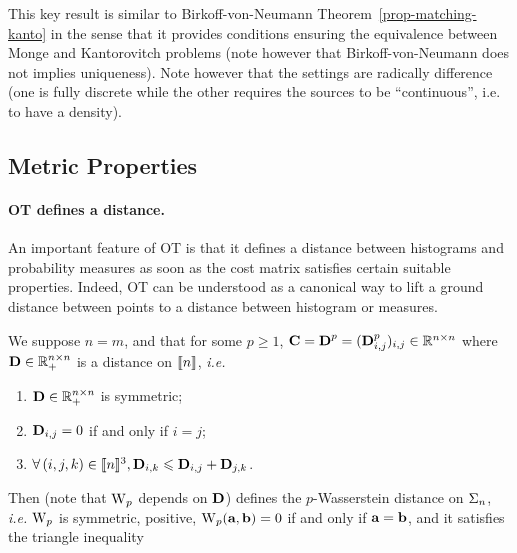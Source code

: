 This key result is similar to Birkoff-von-Neumann Theorem~\ref{prop-matching-kanto} in the sense that it provides conditions ensuring the equivalence between Monge and Kantorovitch problems (note however that Birkoff-von-Neumann does not implies uniqueness). Note however that the settings are radically difference (one is fully discrete while the other requires the sources to  be ``continuous'', i.e. to have a density).


\subsection{Metric Properties}

\paragraph{OT defines a distance.}

An important feature of OT is that it defines a distance between histograms and probability measures as soon as the cost matrix satisfies certain suitable properties. Indeed, OT can be understood as a canonical way to lift a ground distance between points to a distance between histogram or measures. 


\begin{prop}\label{prop-metric-histo}
We suppose $n=m$, and that for some $p \geq 1$, $\mathrm{\textbf{\upshape C}}=\mathrm{\textbf{\upshape D}}^p=(\mathrm{\textbf{\upshape D}}_{i,j}^p)_{i,j} \in \mathbb{R}^{n \times n}$ where $\mathrm{\textbf{\upshape D}} \in \mathbb{R}_+^{n \times n}$ is a distance on $\llbracket n\rrbracket$, \emph{i.e.}
\begin{enumerate}%
	\item $\mathrm{\textbf{\upshape D}} \in \mathbb{R}_+^{n \times n}$ is symmetric; 
	\item $\mathrm{\textbf{\upshape D}}_{i,j}=0$ if and only if $i=j$; 
	\item $\forall \, (i,j,k) \in \llbracket n\rrbracket^3, \mathrm{\textbf{\upshape D}}_{i,k} \leqslant \mathrm{\textbf{\upshape D}}_{i,j}+\mathrm{\textbf{\upshape D}}_{j,k}$.
\end{enumerate}
Then 
(note that $\operatorname{\mathrm{W}}_p$ depends on $\mathrm{\textbf{\upshape D}}$) defines the $p$-Wasserstein distance on $\Sigma_n$, \emph{i.e.} $\operatorname{\mathrm{W}}_p$ is symmetric, positive, $\operatorname{\mathrm{W}}_p(\mathrm{\textbf{\upshape a}},\mathrm{\textbf{\upshape b}})=0$ if and only if $\mathrm{\textbf{\upshape a}} = \mathrm{\textbf{\upshape b}}$, and it satisfies the triangle inequality
\end{prop}


